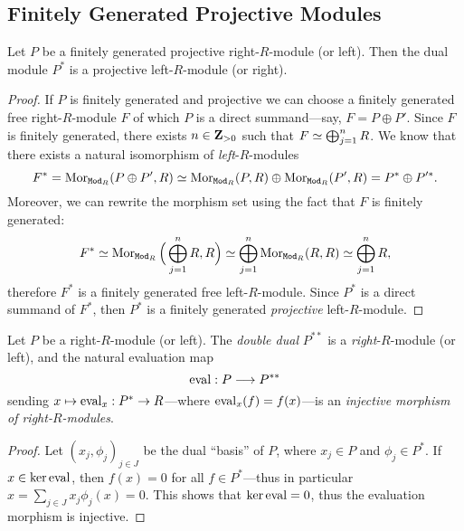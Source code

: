 \subsection{Finitely Generated Projective Modules}

\begin{proposition}
\label{prop:fg-projective-then-dual-module-is-projective}
Let \(P\) be a finitely generated projective right-\(R\)-module (or left). Then
the dual module \(P^{*}\) is a projective left-\(R\)-module (or right).
\end{proposition}

\begin{proof}
If \(P\) is finitely generated and projective we can choose a finitely generated
free right-\(R\)-module \(F\) of which \(P\) is a direct summand---say, \(F = P
\oplus P'\). Since \(F\) is finitely generated, there exists \(n \in \mathbf{Z}_{> 0}\)
such that \(F \simeq \bigoplus_{j=1}^n R\). We know that there exists a natural
isomorphism of \emph{left}-\(R\)-modules
\[
F^{*} = \operatorname{Mor}_{{\texttt{Mod}_{R}}}(P \oplus P', R)
\simeq \operatorname{Mor}_{{\texttt{Mod}_{R}}}(P, R) \oplus \operatorname{Mor}_{{\texttt{Mod}_{R}}}(P', R)
= P^{*} \oplus P'^{*}.
\]
Moreover, we can rewrite the morphism set using the fact that \(F\) is finitely
generated:
\[
F^{*} \simeq \operatorname{Mor}_{{\texttt{Mod}_{R}}}\Big(\bigoplus_{j=1}^n R, R\Big)
\simeq \bigoplus_{j=1}^n \operatorname{Mor}_{{\texttt{Mod}_{R}}}(R, R)
\simeq \bigoplus_{j=1}^n R,
\]
therefore \(F^{*}\) is a finitely generated free left-\(R\)-module. Since
\(P^{*}\) is a direct summand of \(F^{*}\), then \(P^{*}\) is a finitely
generated \emph{projective} left-\(R\)-module.
\end{proof}

\begin{proposition}
\label{prop:projective-module-evaluation-morphism-is-injective}
Let \(P\) be a right-\(R\)-module (or left). The \emph{double dual} \(P^{* *}\)
is a \emph{right}-\(R\)-module (or left), and the natural evaluation map
\[
\operatorname{eval}: P \longrightarrow P^{* *}
\]
sending \(x \mapsto \operatorname{eval}_x: P^{*} \to R\)---where \(\operatorname{eval}_x(f) = f(x)\)---is an
\emph{injective morphism of right-\(R\)-modules}.
\end{proposition}

\begin{proof}
Let \((x_j, \phi_j)_{j \in J}\) be the dual ``basis'' of \(P\), where
\(x_j \in P\) and \(\phi_j \in P^{*}\). If \(x \in \ker \operatorname{eval}\), then
\(f(x) = 0\) for all \(f \in P^{*}\)---thus in particular \(x = \sum_{j \in J}
x_j \phi_j(x) = 0\). This shows that \(\ker \operatorname{eval} = 0\), thus the evaluation
morphism is injective.
\end{proof}

